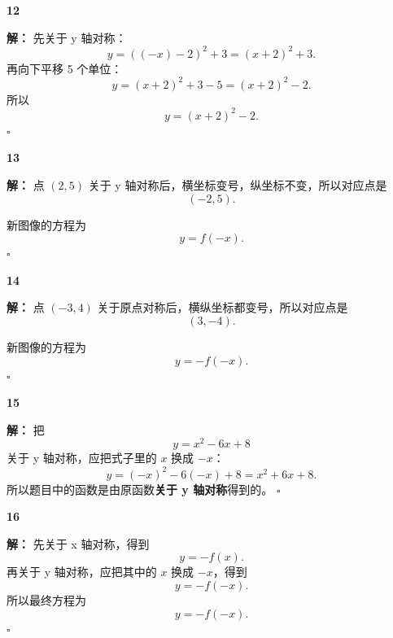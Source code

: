 \documentclass[11pt,a4paper,fontset=fandol]{ctexart}
\theoremstyle{formalexample}
\newenvironment{solution}{\par\noindent\textbf{解：}}{\hfill$\square$\par}
\begin{document}
\textbf{12}\begin{solution}
先关于 y 轴对称：
\[
y=((-x)-2)^2+3=(x+2)^2+3.
\]
再向下平移 5 个单位：
\[
y=(x+2)^2+3-5=(x+2)^2-2.
\]
所以
\[
\boxed{y=(x+2)^2-2}.
\]
\end{solution}

\textbf{13}\begin{solution}
点 $(2,5)$ 关于 y 轴对称后，横坐标变号，纵坐标不变，所以对应点是
\[
\boxed{(-2,5)}.
\]

新图像的方程为
\[
\boxed{y=f(-x)}.
\]
\end{solution}

\textbf{14}\begin{solution}
点 $(-3,4)$ 关于原点对称后，横纵坐标都变号，所以对应点是
\[
\boxed{(3,-4)}.
\]

新图像的方程为
\[
\boxed{y=-f(-x)}.
\]
\end{solution}

\textbf{15}\begin{solution}
把
\[
y=x^2-6x+8
\]
关于 y 轴对称，应把式子里的 $x$ 换成 $-x$：
\[
y=(-x)^2-6(-x)+8=x^2+6x+8.
\]
所以题目中的函数是由原函数\textbf{关于 y 轴对称}得到的。
\end{solution}

\textbf{16}\begin{solution}
先关于 x 轴对称，得到
\[
y=-f(x).
\]
再关于 y 轴对称，应把其中的 $x$ 换成 $-x$，得到
\[
y=-f(-x).
\]
所以最终方程为
\[
\boxed{y=-f(-x)}.
\]
\end{solution}
\end{document}
